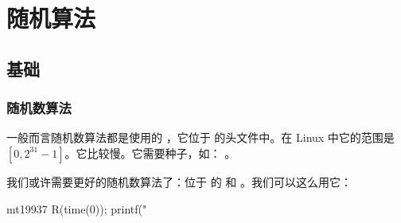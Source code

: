 \chapter{随机算法}

\section{基础}
\subsection{随机数算法}
一般而言随机数算法都是使用的 ，它位于  的头文件中。在
Linux 中它的范围是 $[0, 2^{31} - 1]$。它比较慢。它需要种子，如：
。

我们或许需要更好的随机数算法了：位于  的  和
。我们可以这么用它：
\begin{Cpp}
mt19937 R(time(0));
printf("%
\end{Cpp}
